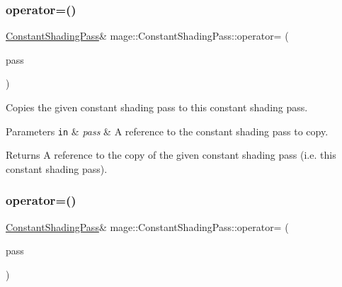 \subsubsection{\texorpdfstring{operator=()}{operator=()}\hspace{0.1cm}{\footnotesize\ttfamily [1/2]}}
{\footnotesize\ttfamily \hyperlink{classmage_1_1_constant_shading_pass}{Constant\+Shading\+Pass}\& mage\+::\+Constant\+Shading\+Pass\+::operator= (\begin{DoxyParamCaption}\item[{const \hyperlink{classmage_1_1_constant_shading_pass}{Constant\+Shading\+Pass} \&}]{pass }\end{DoxyParamCaption})\hspace{0.3cm}{\ttfamily [delete]}}

Copies the given constant shading pass to this constant shading pass.


\begin{DoxyParams}[1]{Parameters}
\mbox{\tt in}  & {\em pass} & A reference to the constant shading pass to copy. \\
\hline
\end{DoxyParams}
\begin{DoxyReturn}{Returns}
A reference to the copy of the given constant shading pass (i.\+e. this constant shading pass). 
\end{DoxyReturn}
\hypertarget{classmage_1_1_constant_shading_pass_a3059d479b7cc1e42e6723bd47e4fae4e}{}\label{classmage_1_1_constant_shading_pass_a3059d479b7cc1e42e6723bd47e4fae4e} 
\subsubsection{\texorpdfstring{operator=()}{operator=()}\hspace{0.1cm}{\footnotesize\ttfamily [2/2]}}
{\footnotesize\ttfamily \hyperlink{classmage_1_1_constant_shading_pass}{Constant\+Shading\+Pass}\& mage\+::\+Constant\+Shading\+Pass\+::operator= (\begin{DoxyParamCaption}\item[{\hyperlink{classmage_1_1_constant_shading_pass}{Constant\+Shading\+Pass} \&\&}]{pass }\end{DoxyParamCaption})\hspace{0.3cm}{\ttfamily [delete]}}

